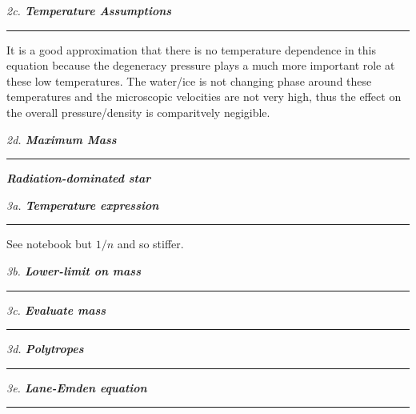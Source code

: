 \documentclass[12pt, letterpaper, twoside]{article}
\newcommand{\question}[1]{{\noindent \it #1}}
\newcommand{\answer}[1]{
    \par\noindent\rule{\textwidth}{0.4pt}#1\vspace{0.5cm}
}
\begin{document}
\question{2c. \textbf{Temperature Assumptions}}
\answer{
    It is a good approximation that there is no temperature dependence in this equation because the degeneracy pressure plays a much more important role at these low temperatures. The water/ice is not changing phase around these temperatures and the microscopic velocities are not very high, thus the effect on the overall pressure/density is comparitvely negigible.
}

\question{2d. \textbf{Maximum Mass}}
\answer{

}

\question{\textbf{Radiation-dominated star}}

\question{3a. \textbf{Temperature expression}}
\answer{
    See notebook but $1/n$ and so stiffer.
}

\question{3b. \textbf{Lower-limit on mass}}
\answer{

}

\question{3c. \textbf{Evaluate mass}}
\answer{

}

\question{3d. \textbf{Polytropes}}
\answer{

}

\question{3e. \textbf{Lane-Emden equation}}
\answer{

}
\end{document}
